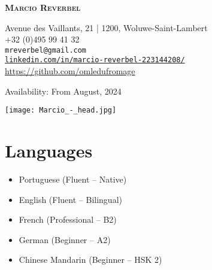 \documentclass[11pt, a4paper, sans]{article}
\newcommand{\mycolor}{mySlateBlue}           %
\newcommand{\thesectionicon}{}
\newcommand{\sectionicon}[1]{\renewcommand{\thesectionicon}{#1}}
\begin{document}
\begin{minipage}{0.65\textwidth}
\vspace{0pt}
\begin{flushleft}
\begin{small}

  {\sffamily\bfseries\scshape\huge
    Marcio Reverbel}

\vspace{2ex}       
  \textcolor{\mycolor}{\faHome} Avenue des Vaillants, 21 | 1200, Woluwe-Saint-Lambert\\
  \textcolor{\mycolor}{\faPhone} +32 (0)495 99 41 32\\
  \textcolor{\mycolor}{\faEnvelope} \texttt{mreverbel@gmail.com}\\
  \textcolor{\mycolor}{\faLinkedin} \href{https://linkedin.com/in/marcio-reverbel-223144208/}{\texttt{linkedin.com/in/marcio-reverbel-223144208/}}\\
  \textcolor{\mycolor}{\faGithub} \url{https://github.com/omledufromage}
  
  \vspace{1ex}
  \textcolor{\mycolor}{Availability:} From August, 2024 
  \\
\end{small}
\end{flushleft}
\end{minipage}%
%
\begin{minipage}{0.35\textwidth}
\begin{flushright}
    \texttt{[image: Marcio\_-\_head.jpg]}
    \label{img:g}
\end{flushright}
\end{minipage}
\sectionicon{\faLanguage}
\section{Languages}
\begin{minipage}[t]{0.50\textwidth}
\begin{itemize}
\setlength{\itemsep}{-5pt}
\item Portuguese (Fluent – Native)
\item English (Fluent – Bilingual)
\item French (Professional – B2)
\end{itemize}
\end{minipage}
\begin{minipage}[t]{0.50\textwidth}
\begin{itemize}
\setlength{\itemsep}{-5pt}
\item German (Beginner – A2)
\item Chinese Mandarin (Beginner – HSK 2)
\end{itemize}
\hfill
\end{minipage}
\sectionicon{\faGraduationCap}
\end{document}
